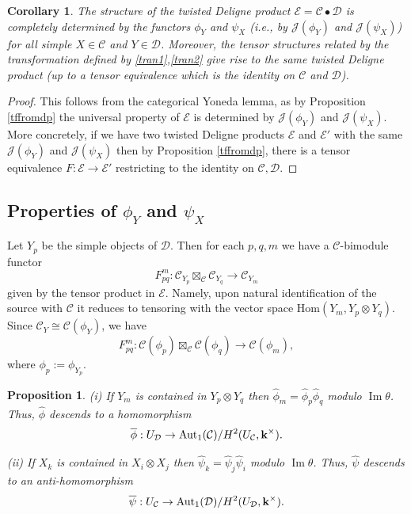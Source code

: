 \documentclass[12pt]{amsart}
\numberwithin{equation}{section}
\newtheorem{proposition}[theorem]{Proposition}
\newtheorem{corollary}[theorem]{Corollary}
\theoremstyle{definition}
\newcommand{\Hom}{\text{Hom}}
\newcommand{\Aut}{\text{Aut}}
\newcommand{\1}{_{(1)}}
\newcommand{\2}{_{(2)}}
\newcommand{\3}{_{(3)}}
\newcommand{\4}{_{(4)}}
\newcommand{\5}{_{(5)}}
\newcommand{\6}{_{(6)}}
\newcommand{\C}{\mathcal{C}}
\theoremstyle{plain}
\theoremstyle{definition}
\theoremstyle{remark}
\def\C{\mathcal{C}}
\def\D{\mathcal{D}}
\def\E{\mathcal{E}}
\def\Aut{\mathop{\mathrm{Aut}}\nolimits}
\def\Hom{\mathrm{Hom}}
\def\Im{\mathop{Im}}
\begin{document}
\begin{corollary} \label{dete} 
The structure of the twisted Deligne product $\E=\C\bullet\D$ is completely determined by the functors $\phi_Y$ and $\psi_X$ (i.e., by $\mathcal J(\phi_Y)$ and $\mathcal J(\psi_X)$) for all simple $X\in \C$ and $Y\in \D$. Moreover, the tensor structures related by the transformation defined by \eqref{tran1},\eqref{tran2} give rise to the same twisted Deligne product (up to a tensor equivalence which is the 
identity on $\C$ and $\D$). 
\end{corollary} 

\begin{proof} This follows from the categorical Yoneda lemma, as by Proposition \ref{tffromdp} the universal property of $\E$ is determined by $\mathcal J(\phi_Y)$ and $\mathcal J(\psi_X)$. More concretely, if we have two twisted Deligne products $\E$ and $\E'$ with the same $\mathcal J(\phi_Y)$ and $\mathcal J(\psi_X)$ then by Proposition \ref{tffromdp}, there is a tensor equivalence $F: \E\to \E'$ restricting to the identity on $\C,\D$.  
\end{proof} 

\subsection{Properties of $\phi_Y$ and $\psi_X$}

Let $Y_p$ be the simple objects of $\D$. Then for each $p,q,m$ we have a $\C$-bimodule functor 
$$
F_{pq}^m: \C_{Y_p}\boxtimes_{\C}\C_{Y_q}\to \C_{Y_m}
$$ 
given by the tensor product in $\E$. Namely, upon natural identification of the source with $\C$ 
it reduces to tensoring with the vector space $\Hom(Y_m,Y_p\otimes Y_q)$. Since
 $\C_Y\cong \C(\phi_Y)$, we have 
 $$
 F_{pq}^m: \C(\phi_p)\boxtimes_\C \C(\phi_q)\to \C(\phi_m),
 $$ 
 where $\phi_p:=\phi_{Y_p}$. 

\begin{proposition}\label{cocyc} (i) If $Y_m$ is contained in $Y_p\otimes Y_q$ then $\widehat{\phi}_m=\widehat{\phi}_p\widehat{\phi}_q$ modulo $\Im \theta$. 
Thus, $\widehat\phi$ descends to a homomorphism 
$$
\overline{\phi}: U_\D\to \Aut_1(\C)/H^2(U_\C,\bold k^\times).
$$  

(ii) If $X_k$ is contained in $X_i\otimes X_j$ then $\widehat{\psi}_k=\widehat{\psi}_j\widehat{\psi}_i$ modulo $\Im \theta$. Thus, $\widehat\psi$ descends to an anti-homomorphism 
$$
\overline{\psi}: U_\C\to \Aut_1(\D)/H^2(U_\D,\bold k^\times).
$$  
\end{proposition} 
\end{document}
